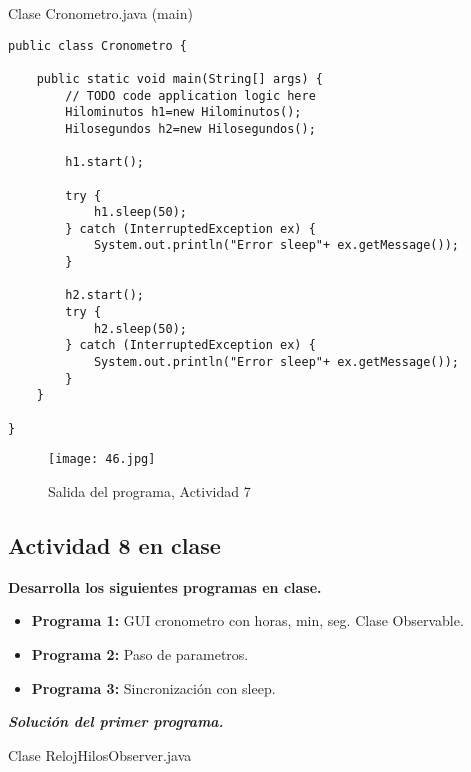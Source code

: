 \begin{center}
Clase Cronometro.java (main)
\end{center}

\begin{verbatim}
public class Cronometro {

    public static void main(String[] args) {
        // TODO code application logic here
        Hilominutos h1=new Hilominutos();
        Hilosegundos h2=new Hilosegundos();
        
        h1.start();
        
        try {
            h1.sleep(50);
        } catch (InterruptedException ex) {
            System.out.println("Error sleep"+ ex.getMessage());
        }
        
        h2.start();
        try {
            h2.sleep(50);
        } catch (InterruptedException ex) {
            System.out.println("Error sleep"+ ex.getMessage());
        } 
    }
    
}
\end{verbatim} \vspace{1cm}

\begin{figure}[h!]
		\centering
		{\texttt{[image: 46.jpg]}\par} 
		\caption{Salida del programa, Actividad 7}\vspace{1cm}
\end{figure}\newpage

{\raggedright
\subsection{Actividad 8 en clase}
}\vspace{.5cm}

\textbf{Desarrolla los siguientes programas en clase.}\vspace{.2mm}

\begin{itemize}
\item \textbf{Programa 1:} GUI cronometro con horas, min, seg. Clase Observable.
\item \textbf{Programa 2:} Paso de parametros.
\item \textbf{Programa 3:} Sincronización con sleep.
\end{itemize}\vspace{.5cm}

\textbf{\textit{Solución del primer programa.}}

\begin{center}
Clase RelojHilosObserver.java
\end{center}

